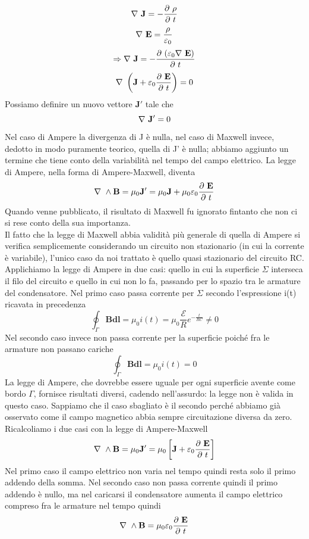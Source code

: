 \documentclass[
10pt, %
a4paper, %
oneside, %
headinclude,footinclude, %
BCOR5mm, %
]{scrartcl}
\begin{document}
\[\mathbf{\nabla\ }\mathbf{J}=-\frac{\partial\  \rho}{\partial\  t}\]
\[\mathbf{\nabla\ }\mathbf{E}=\frac{ \rho}{\varepsilon_0}\]
\[\Rightarrow \mathbf{\nabla\ }\mathbf{J}= -\frac{\partial\  (\varepsilon_0\mathbf{\nabla\ }\mathbf{E})}{\partial\  t}\]
\[\mathbf{\nabla\ }\left(\mathbf{J}+\varepsilon_0\frac{\partial\ \mathbf{E}}{\partial\  t}\right) = 0\]
Possiamo definire un nuovo vettore $\mathbf{J'}$ tale che
\[\mathbf{\nabla\ }\mathbf{J'}=0\]
Nel caso di Ampere la divergenza di J è nulla, nel caso di Maxwell invece, dedotto in modo puramente teorico, quella di J' è nulla; abbiamo aggiunto un termine che tiene conto della variabilità nel tempo del campo elettrico. La legge di Ampere, nella forma di Ampere-Maxwell, diventa
\[\mathbf{\nabla\ }\wedge\mathbf{B}=\mu_0\mathbf{J'}=\mu_0\mathbf{J}+\mu_0\varepsilon_0\frac{\partial\ \mathbf{E}}{\partial\  t}\]
Quando venne pubblicato, il risultato di Maxwell fu ignorato fintanto che non ci si rese conto della sua importanza.\\
Il fatto che la legge di Maxwell abbia validità più generale di quella di Ampere si verifica semplicemente considerando un circuito non stazionario (in cui la corrente è variabile), l'unico caso da noi trattato è quello quasi stazionario del circuito RC. Applichiamo la legge di Ampere in due casi: quello in cui la superficie $\Sigma$ interseca il filo del circuito e quello in cui non lo fa, passando per lo spazio tra le armature del condensatore. Nel primo caso passa corrente per $\Sigma$ secondo l'espressione i(t) ricavata in precedenza
\[\oint_{\Gamma}\mathbf{B}\mathbf{dl}=\mu_0 i(t)= \mu_0 \frac{\mathcal{E}}{R}e^{-\frac{t}{RC}}\neq0\]
Nel secondo caso invece non passa corrente per la superficie poiché fra le armature non passano cariche
\[\oint_{\Gamma}\mathbf{B}\mathbf{dl}=\mu_0 i(t)= 0\]
La legge di Ampere, che dovrebbe essere uguale per ogni superficie avente come bordo $\Gamma$, fornisce risultati diversi, cadendo nell'assurdo: la legge non è valida in questo caso. Sappiamo che il caso sbagliato è il secondo perché abbiamo già osservato come il campo magnetico abbia sempre circuitazione diversa da zero.\\
Ricalcoliamo i due casi con la legge di Ampere-Maxwell
\[\mathbf{\nabla\ }\wedge\mathbf{B}=\mu_0\mathbf{J'}=\mu_0\left[\mathbf{J}+\varepsilon_0\frac{\partial\  \mathbf{E}}{\partial\  t}\right]\]
Nel primo caso il campo elettrico non varia nel tempo quindi resta solo il primo addendo della somma. Nel secondo caso non passa corrente quindi il primo addendo è nullo, ma nel caricarsi il condensatore aumenta il campo elettrico compreso fra le armature nel tempo quindi 
\[\mathbf{\nabla\ }\wedge\mathbf{B}=\mu_0\varepsilon_0\frac{\partial\  \mathbf{E}}{\partial\  t}\]
\end{document}
